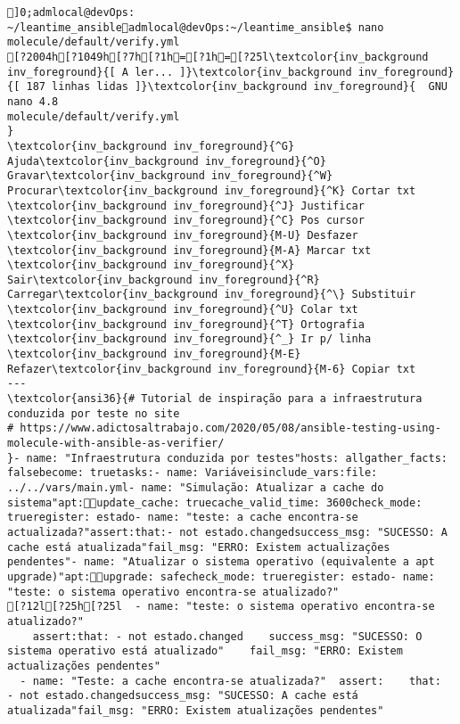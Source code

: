 \documentclass{scrartcl}
\title{}
\begin{document}
\begin{Verbatim}
]0;admlocal@devOps: ~/leantime_ansibleadmlocal@devOps:~/leantime_ansible$ nano molecule/default/verify.yml 
[?2004h[?1049h[?7h[?1h=[?1h=[?25l\textcolor{inv_background inv_foreground}{[ A ler... ]}\textcolor{inv_background inv_foreground}{[ 187 linhas lidas ]}\textcolor{inv_background inv_foreground}{  GNU nano 4.8                                          molecule/default/verify.yml                                                       }
\textcolor{inv_background inv_foreground}{^G} Ajuda\textcolor{inv_background inv_foreground}{^O} Gravar\textcolor{inv_background inv_foreground}{^W} Procurar\textcolor{inv_background inv_foreground}{^K} Cortar txt    \textcolor{inv_background inv_foreground}{^J} Justificar    \textcolor{inv_background inv_foreground}{^C} Pos cursor    \textcolor{inv_background inv_foreground}{M-U} Desfazer     \textcolor{inv_background inv_foreground}{M-A} Marcar txt
\textcolor{inv_background inv_foreground}{^X} Sair\textcolor{inv_background inv_foreground}{^R} Carregar\textcolor{inv_background inv_foreground}{^\} Substituir    \textcolor{inv_background inv_foreground}{^U} Colar txt     \textcolor{inv_background inv_foreground}{^T} Ortografia    \textcolor{inv_background inv_foreground}{^_} Ir p/ linha   \textcolor{inv_background inv_foreground}{M-E} Refazer\textcolor{inv_background inv_foreground}{M-6} Copiar txt
---
\textcolor{ansi36}{# Tutorial de inspiração para a infraestrutura conduzida por teste no site
# https://www.adictosaltrabajo.com/2020/05/08/ansible-testing-using-molecule-with-ansible-as-verifier/
}- name: "Infraestrutura conduzida por testes"hosts: allgather_facts: falsebecome: truetasks:- name: Variáveisinclude_vars:file: ../../vars/main.yml- name: "Simulação: Atualizar a cache do sistema"apt:update_cache: truecache_valid_time: 3600check_mode: trueregister: estado- name: "teste: a cache encontra-se actualizada?"assert:that:- not estado.changedsuccess_msg: "SUCESSO: A cache está atualizada"fail_msg: "ERRO: Existem actualizações pendentes"- name: "Atualizar o sistema operativo (equivalente a apt upgrade)"apt:upgrade: safecheck_mode: trueregister: estado- name: "teste: o sistema operativo encontra-se atualizado?"
[?12l[?25h[?25l  - name: "teste: o sistema operativo encontra-se atualizado?"
    assert:that: - not estado.changed    success_msg: "SUCESSO: O sistema operativo está atualizado"    fail_msg: "ERRO: Existem actualizações pendentes"
  - name: "Teste: a cache encontra-se atualizada?"  assert:    that:  - not estado.changedsuccess_msg: "SUCESSO: A cache está atualizada"fail_msg: "ERRO: Existem atualizações pendentes"

\end{Verbatim}
\end{document}
